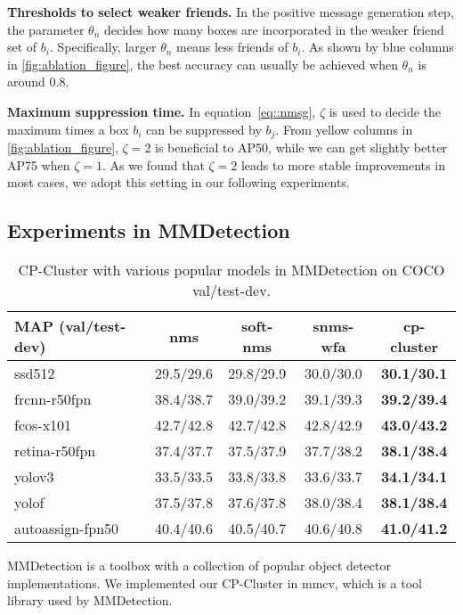 \documentclass[10pt,twocolumn,letterpaper]{article}
\begin{document}
\textbf{Thresholds to select weaker friends.} In the positive message generation step, the parameter $\theta_{n}$ decides how many boxes are incorporated in the weaker friend set of $b_i$. Specifically, larger $\theta_{n}$ means less friends of $b_i$.
As shown by blue columns in \cref{fig:ablation_figure}, the best accuracy can usually be achieved when $\theta_{n}$ is around $0.8$.

\textbf{Maximum suppression time.} In equation~\eqref{eq::nmsg}, $\zeta$ is used to decide the maximum times a box $b_i$ can be suppressed by $b_j$.
From yellow columns in \cref{fig:ablation_figure}, $\zeta=2$ is beneficial to AP50, while we can get slightly better AP75 when $\zeta=1$. As we found that $\zeta=2$ leads to more stable improvements in most cases, we adopt this setting in our following experiments.

\subsection{Experiments in MMDetection}
\label{sec:sub_exp_mmdetect}
\begin{table*}[h]
  \centering
  \small
  \begin{tabular}{lcccc}
  \toprule
  MAP (val/test-dev)    & nms       & soft-nms  & snms-wfa  & cp-cluster        \\ 
  \midrule
  ssd512           & 29.5/29.6 & 29.8/29.9 & 30.0/30.0 & \textbf{30.1/30.1}      \\ 
  frcnn-r50fpn     & 38.4/38.7 & 39.0/39.2 & 39.1/39.3 & \textbf{39.2/39.4}      \\ 
  fcos-x101        & 42.7/42.8 & 42.7/42.8 & 42.8/42.9 & \textbf{43.0/43.2}      \\ 
  retina-r50fpn    & 37.4/37.7 & 37.5/37.9 & 37.7/38.2 & \textbf{38.1/38.4}      \\ 
  yolov3           & 33.5/33.5 & 33.8/33.8 & 33.6/33.7 & \textbf{34.1/34.1}      \\ 
  yolof            & 37.5/37.8 & 37.6/37.8 & 38.0/38.4 & \textbf{38.1/38.4}      \\ 
  autoassign-fpn50 & 40.4/40.6 & 40.5/40.7 & 40.6/40.8 & \textbf{41.0/41.2}      \\ 
  \bottomrule
  \end{tabular}
  \caption{CP-Cluster with various popular models in MMDetection on COCO val/test-dev.}
  \label{tab:exp_full_mmdetect}
\end{table*}
MMDetection\cite{chen2019mmdetection} is a toolbox with a collection of popular object detector implementations. We implemented our CP-Cluster in mmcv, which is a tool library used by MMDetection.
\end{document}
